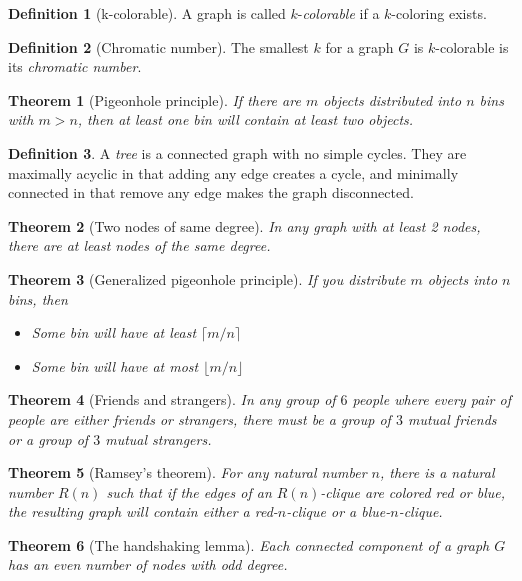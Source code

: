 \documentclass[12pt]{article}
\newtheorem{theorem}{Theorem}[section]
\theoremstyle{definition}
\newtheorem{definition}{Definition}[section]
\begin{document}
\begin{definition}[k-colorable]
    A graph is called $k$-\emph{colorable} if a $k$-coloring exists.
\end{definition}
\begin{definition}[Chromatic number]
    The smallest $k$ for a graph $G$ is $k$-colorable is its \emph{chromatic number}.
\end{definition}
\begin{theorem}[Pigeonhole principle]
    If there are $m$ objects distributed into $n$ bins with $m > n$, then at least one bin will contain at least two objects.
\end{theorem}
\begin{definition}
    A \emph{tree} is a connected graph with no simple cycles. They are maximally acyclic in that adding any edge creates a cycle, and minimally connected in that remove any edge makes the graph disconnected.
\end{definition}

\begin{theorem}[Two nodes of same degree]
    In any graph with at least 2 nodes, there are at least nodes of the same degree.
\end{theorem}
\begin{theorem}[Generalized pigeonhole principle]
    If you distribute $m$ objects into $n$ bins, then
    \begin{itemize}
        \item Some bin will have at least $\lceil m/n \rceil$
        \item Some bin will have at most $\lfloor m/n \rfloor$
    \end{itemize}
\end{theorem}
\begin{theorem}[Friends and strangers]
    In any group of $6$ people where every pair of people are either friends or strangers, there must be a group of $3$ mutual friends or a group of $3$ mutual strangers.
\end{theorem}
\begin{theorem}[Ramsey's theorem]
    For any natural number $n$, there is a natural number $R(n)$ such that if the edges of an $R(n)$-clique are colored red or blue, the resulting graph will contain either a red-$n$-clique or a blue-$n$-clique.
\end{theorem}
\begin{theorem}[The handshaking lemma]
    Each connected component of a graph $G$ has an even number of nodes with odd degree.
\end{theorem}
\end{document}
